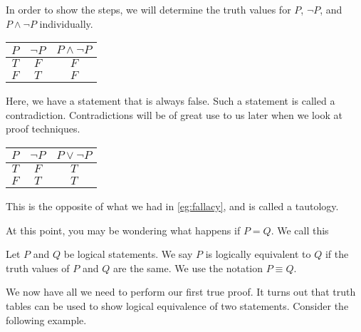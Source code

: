 \begin{example}{}\label{eg:fallacy}
	In order to show the steps, we will determine the truth values for $P$, $\neg P$, and $P\land\neg P$ individually.
	\begin{center}
		\begin{tabular}{c | c | c}
			$P$ & $\neg P$ & $P\land\neg P$ \\
			\hline
			$T$ & $F$      & $F$\\
			$F$ & $T$      & $F$
		\end{tabular}
	\end{center}
    Here, we have a statement that is always false. Such a statement is called a contradiction. Contradictions will be of great use to us later when we look at proof techniques.
\end{example}

\begin{example}{}\label{eg:tautology}
    \begin{center}
		\begin{tabular}{c | c | c}
			$P$ & $\neg P$ & $P\lor\neg P$ \\
			\hline
			$T$ & $F$      & $T$\\
			$F$ & $T$      & $T$
		\end{tabular}
	\end{center}
    This is the opposite of what we had in \cref{eg:fallacy}, and is called a tautology.
\end{example}

At this point, you may be wondering what happens if $P = Q$. We call this

\begin{definition}{}
	Let $P$ and $Q$ be logical statements. We say $P$ is logically equivalent to $Q$ if the truth values of $P$ and $Q$ are the same. We use the notation $P\equiv Q$.
\end{definition}

\noindent We now have all we need to perform our first true proof. It turns out that truth tables can be used to show logical equivalence of two statements. Consider the following example.

